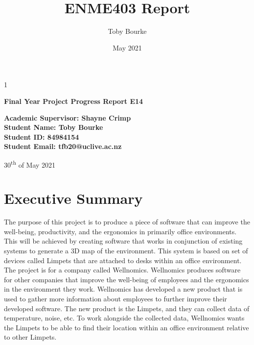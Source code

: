 1\documentclass{article}
\title{ENME403 Report}
\author{Toby Bourke}
\date{May 2021}
\begin{document}
\begin{titlepage}
   \begin{center}
       \vspace*{1cm}

       {\huge\textbf{Final Year Project Progress Report E14}}
       \vspace{4cm}
		
		\textbf{Academic Supervisor: Shayne Crimp}\\
		
		\vspace{5cm}
		\textbf{Student Name: Toby Bourke}\\
		
		\textbf{Student ID: 84984154}\\
		
		\textbf{Student Email: tfb20@uclive.ac.nz}\\
		
       \vspace{1.5cm}
            
       \vspace{7cm}
       
       30\textsuperscript{th} of May 2021
            
   \end{center}
\end{titlepage}

\section*{Executive Summary}
The purpose of this project is to produce a piece of software that can improve the well-being, productivity, and the ergonomics in primarily office environments. This will be achieved by creating software that works in conjunction of existing systems to generate a 3D map of the environment. This system is based on set of devices called Limpets that are attached to desks within an office environment.\\


The project is for a company called Wellnomics. Wellnomics produces software for other companies that improve the well-being of employees and the ergonomics in the environment they work. Wellnomics has developed a new product that is used to gather more information about employees to further improve their developed software. The new product is the Limpets, and they can collect data of temperature, noise, etc. To work alongside the collected data, Wellnomics wants the Limpets to be able to find their location within an office environment relative to other Limpets.\\
\end{document}
